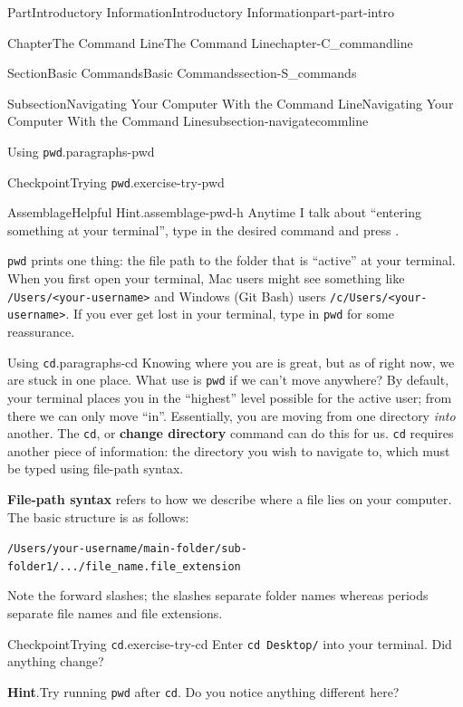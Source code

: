 \documentclass[oneside,10pt,]{book}
\newcommand{\blocktitlefont}{\relax}
\newcommand{\mono}[1]{\texttt{#1}}
\newcommand{\terminology}[1]{\textbf{#1}}
\newcommand{\kbd}[1]{\keys{{#1}}}
\begin{document}
\begin{partptx}{Part}{Introductory Information}{}{Introductory Information}{}{}{part-part-intro}
\begin{chapterptx}{Chapter}{The Command Line}{}{The Command Line}{}{}{chapter-C_commandline}
\begin{sectionptx}{Section}{Basic Commands}{}{Basic Commands}{}{}{section-S_commands}
\begin{subsectionptx}{Subsection}{Navigating Your Computer With the Command Line}{}{Navigating Your Computer With the Command Line}{}{}{subsection-navigatecommline}
\begin{paragraphs}{Using \mono{pwd}.}{paragraphs-pwd}
\begin{inlineexercise}{Checkpoint}{Trying \mono{pwd}.}{exercise-try-pwd}
\end{inlineexercise}%
\begin{assemblage}{Assemblage}{Helpful Hint.}{assemblage-pwd-h}%
Anytime I talk about ``entering something at your terminal'', type in the desired command and press \kbd{Enter}.%
\end{assemblage}
\mono{pwd} prints one thing: the file path to the folder that is ``active'' at your terminal. When you first open your terminal, Mac users might see something like \mono{/Users/<your-username>} and Windows (Git Bash) users \mono{/c/Users/<your-username>}. If you ever get lost in your terminal, type in \mono{pwd} for some reassurance.%
\end{paragraphs}%
\begin{paragraphs}{Using \mono{cd}.}{paragraphs-cd}%
\index{\mono{cd}}%
%
%
%
\index{command line!\mono{cd}}%
Knowing where you are is great, but as of right now, we are stuck in one place. What use is \mono{pwd} if we can't move anywhere? By default, your terminal places you in the ``highest'' level possible for the active user; from there we can only move ``in''. Essentially, you are moving from one directory \emph{into} another. The \mono{cd}, or \terminology{change directory} command can do this for us. \mono{cd} requires another piece of information: the directory you wish to navigate to, which must be typed using file-path syntax.%
\par
\terminology{File-path syntax} refers to how we describe where a file lies on your computer. The basic structure is as follows:%
\par
\mono{/Users/your-username/main-folder/sub-folder1/.../file\_name.file\_extension}%
\par
Note the forward slashes; the slashes separate folder names whereas periods separate file names and file extensions.%
\begin{inlineexercise}{Checkpoint}{Trying \mono{cd}.}{exercise-try-cd}%
Enter \mono{cd Desktop/} into your terminal. Did anything change?%
\par\smallskip%
\noindent\textbf{\blocktitlefont Hint}.\hypertarget{hint-try-cd-c}{}\quad{}Try running \mono{pwd} after \mono{cd}. Do you notice anything different here?%
\end{inlineexercise}%

\end{paragraphs}
\end{subsectionptx}
\end{sectionptx}
\end{chapterptx}
\end{partptx}
\end{document}
